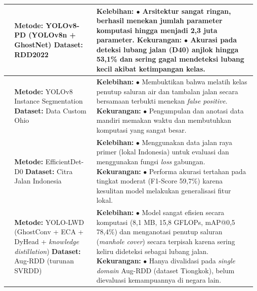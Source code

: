 \begin{longtable}{>{\raggedright}p{1.4cm}>{\raggedright}p{3.3cm}>{\raggedright\arraybackslash}p{7.8cm}}
  \hline
  \cite{Zeng2024}             & \textbf{Metode:} YOLOv8-PD (YOLOv8n + GhostNet) \newline \textbf{Dataset:} RDD2022                                          & \textbf{Kelebihan:} \newline $\bullet$ Arsitektur sangat ringan, berhasil menekan jumlah parameter komputasi hingga menjadi 2,3 juta parameter. \newline \textbf{Kekurangan:} \newline $\bullet$ Akurasi pada deteksi lubang jalan (D40) anjlok hingga 53,1\% dan sering gagal mendeteksi lubang kecil akibat ketimpangan kelas.                                    \\
  \hline
  \cite{matouq2024ai}         & \textbf{Metode:} YOLOv8 Instance Segmentation \newline \textbf{Dataset:} Data Custom Ohio                                   & \textbf{Kelebihan:} \newline $\bullet$ Membuktikan bahwa melatih kelas penutup saluran air dan tambalan jalan secara bersamaan terbukti menekan \textit{false positive}. \newline \textbf{Kekurangan:} \newline $\bullet$ Pengumpulan dan anotasi data mandiri memakan waktu dan membutuhkan komputasi yang sangat besar.                                           \\
  \hline
  \cite{hugo2025efficientdet} & \textbf{Metode:} EfficientDet-D0 \newline \textbf{Dataset:} Citra Jalan Indonesia                                           & \textbf{Kelebihan:} \newline $\bullet$ Menggunakan data jalan raya primer (lokal Indonesia) untuk evaluasi dan menggunakan fungsi \textit{loss} gabungan. \newline \textbf{Kekurangan:} \newline $\bullet$ Performa akurasi tertahan pada tingkat moderat (F1-Score 59,7\%) karena kesulitan model melakukan generalisasi fitur lokal.                              \\
  \hline
  \cite{Shi_2026}             & \textbf{Metode:} YOLO-LWD (GhostConv + ECA + DyHead + \textit{knowledge distillation}) \newline \textbf{Dataset:} Aug-RDD (turunan SVRDD)                                              & \textbf{Kelebihan:} \newline $\bullet$ Model sangat efisien secara komputasi (8,1 MB, 15,8 GFLOPs, mAP@0,5 78,4\%) dan menganotasi penutup saluran (\textit{manhole cover}) secara terpisah karena sering keliru dideteksi sebagai lubang jalan. \newline \textbf{Kekurangan:} \newline $\bullet$ Hanya divalidasi pada \textit{single domain} Aug-RDD (dataset Tiongkok), belum dievaluasi kemampuannya di negara lain.                                          \\

\end{longtable}
